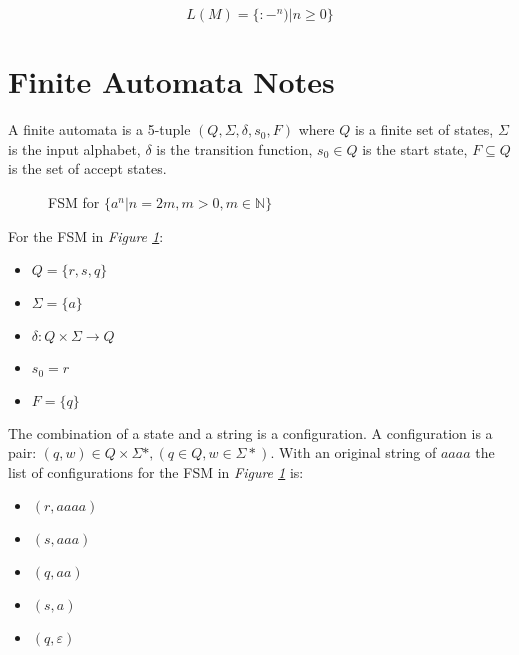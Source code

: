 \documentclass[11pt]{article}
\begin{document}
$$L(M) = \{:-^n) | n \geq 0\}$$

\newpage
\section{Finite Automata Notes}
A finite automata is a 5-tuple
$ (Q, \Sigma, \delta, s_0, F) $
where $Q$ is a finite set of states, $\Sigma$ is the input alphabet, $\delta$ is the
transition function, $s_0 \in Q$ is the start state, $F \subseteq Q$ is the set of accept states.

\begin{figure}[ht]
	\centering
	\caption{FSM for $\{a^n | n=2m, m>0, m \in \mathbb{N} \}$}
	\label{fig:example4}
\end{figure}


For the FSM in \emph{Figure \ref{fig:example4}}:
\begin{itemize}
	\item $Q = \{r, s, q\}$
	\item $\Sigma = \{a\}$
	\item $\delta : Q \times \Sigma \to Q$
	\item $s_0 = r$
	\item $F = \{q\}$
\end{itemize}

The combination of a state and a string is a configuration.
A configuration is a pair: $(q, w) \in Q \times \Sigma\ast, (q \in Q, w \in
	\Sigma\ast)$.
With an original string of $aaaa$ the list of configurations for the FSM in
\emph{Figure \ref{fig:example4}} is:

\begin{itemize}
	\item $(r, aaaa)$
	\item $(s, aaa)$
	\item $(q, aa)$
	\item $(s, a)$
	\item $(q, \varepsilon)$
\end{itemize}
\end{document}
